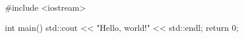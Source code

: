 \documentclass{article}
\begin{document}
\begin{cppcode}
\begin{tcboxedminipage}{\linewidth}
#include <iostream>

int main()
{
  std::cout << "Hello, world!" << std::endl;
  return 0;
}
\end{tcboxedminipage}
\end{cppcode}
\end{document}
